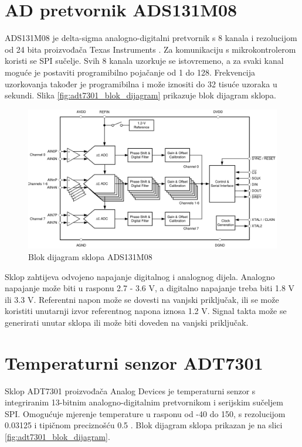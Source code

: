 \section{AD pretvornik ADS131M08} \label{section_adc}

ADS131M08 je delta-sigma analogno-digitalni pretvornik  s 8 kanala i rezolucijom od 24 bita proizvođača Texas Instruments \cite{ads131m08_datasheet}. Za komunikaciju s mikrokontrolerom koristi se SPI sučelje. Svih 8 kanala uzorkuje se istovremeno, a za svaki kanal moguće je postaviti programibilno pojačanje od 1 do 128. Frekvencija uzorkovanja također je programibilna i može iznositi do 32 tisuće uzoraka u sekundi. Slika \ref{fig:adt7301_blok_dijagram} prikazuje blok dijagram sklopa.

\begin{figure}[htb]
    \centering
    \includegraphics[width=\textwidth]{slike/ads131m08_blok_dijagram.png}
    \caption{Blok dijagram sklopa ADS131M08 \cite{ads131m08_datasheet}}
    \label{fig:ads131m08_blok_dijagram}
\end{figure}

Sklop zahtijeva odvojeno napajanje digitalnog i analognog dijela. Analogno napajanje može biti u rasponu 2.7 - 3.6 V, a digitalno napajanje treba biti 1.8 V ili 3.3 V. Referentni napon može se dovesti na vanjski priključak, ili se može koristiti unutarnji izvor referentnog napona iznosa 1.2 V. Signal takta može se generirati unutar sklopa ili može biti doveden na vanjski priključak.

\section{Temperaturni senzor ADT7301}

Sklop ADT7301 proizvođača Analog Devices je temperaturni senzor s integriranim 13-bitnim analogno-digitalnim pretvornikom i serijskim sučeljem SPI. Omogućuje mjerenje temperature u rasponu od -40\textcelsius{} do 150\textcelsius{}, s rezolucijom 0.03125\textcelsius{} i tipičnom preciznošću \textpm{} 0.5\textcelsius{} \cite{adt7301_datasheet}. Blok dijagram sklopa prikazan je na slici \ref{fig:adt7301_blok_dijagram}.

